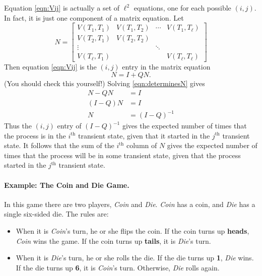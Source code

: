 \documentclass{book}
\begin{document}
Equation \eqref{eqn:Vij} is actually a set of $\ell^2$ equations,
one for each possible $(i,j)$.  In fact, it is just one component
of a matrix equation.
Let
\begin{equation}
   N = \begin{bmatrix}
            V(T_1,T_1) & V(T_1,T_2) & \cdots & V(T_1,T_{\ell}) \\
	    V(T_2,T_1) & V(T_2,T_2) \\
	       \vdots  &  &   \ddots \\
	    V(T_{\ell},T_1) & & & V(T_{\ell},T_{\ell})
       \end{bmatrix}
\end{equation}
Then equation \eqref{eqn:Vij} is the $(i,j)$ entry in the
matrix equation
\begin{equation}
   N = I + QN.
\label{eqn:determinesN}
\end{equation}
(You should check this yourself!)
Solving \eqref{eqn:determinesN} gives
\begin{equation}
\begin{split}
  N-QN & = I \\
  (I-Q)N & = I \\
       N & = (I-Q)^{-1}
\end{split}
\end{equation}
Thus the $(i,j)$ entry of $(I-Q)^{-1}$ gives the expected number
of times that the process is in the $i^{\textrm{th}}$ transient
state, given that it started in the $j^{\textrm{th}}$
transient state.
It follows that the sum of the $i^{\textrm{th}}$ column of $N$
gives the expected number of times that the process will be in 
some transient state, given that the process started
in the $j^{\textrm{th}}$ transient state.

\paragraph{Example: The Coin and Die Game.}
In this game there are two players, \emph{Coin}
and \emph{Die}. \emph{Coin} has a coin, and \emph{Die} has a
single six-sided die. The rules are:

\begin{itemize}
\item
When it is \emph{Coin}'s turn, he or she flips the coin.
If the coin turns up \textbf{heads}, \emph{Coin} wins the game.
If the coin turns up \textbf{tails}, it is \emph{Die}'s turn.

\item
When it is \emph{Die}'s turn, he or she rolls the die.
If the die turns up \textbf{1}, \emph{Die} wins.
If the die turns up \textbf{6}, it is \emph{Coin}'s turn.
Otherwise, \emph{Die} rolls again.
\end{itemize}
\end{document}
